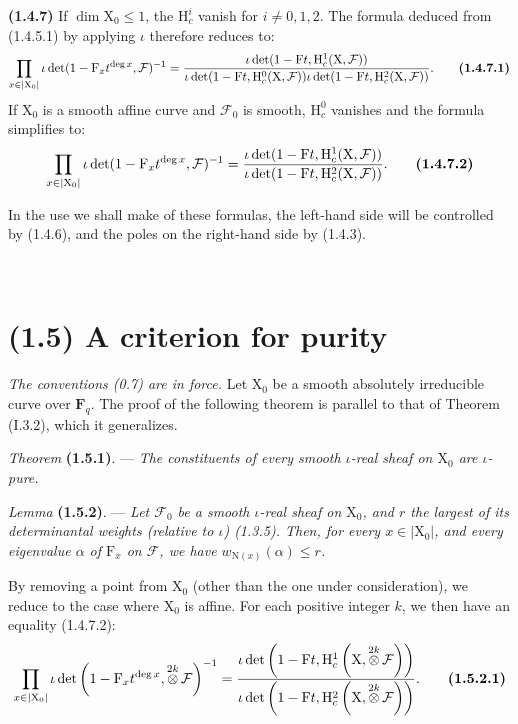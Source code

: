 \documentclass[11pt,leqno]{article}
\newcommand{\Page}[1]{\ifvmode\noindent\else\unskip\ \fi{\footnotesize\textcolor{gray}{[p.\,#1]}}\ \ignorespaces}
\begin{document}
\textbf{(1.4.7)} If \(\dim\mathrm{X}_0\le1\), the \(\mathrm{H}_c^i\) vanish for \(i\ne0,1,2\). The formula deduced from (1.4.5.1) by applying \(\iota\) therefore reduces to:
\[
\prod_{x\in|\mathrm{X}_0|}
\iota\det(1-\mathrm{F}_x t^{\deg x},\mathcal{F})^{-1}
=
\frac{\iota\det(1-\mathrm{F}t,\mathrm{H}_c^1(\mathrm{X},\mathcal{F}))}
{\iota\det(1-\mathrm{F}t,\mathrm{H}_c^0(\mathrm{X},\mathcal{F}))
 \iota\det(1-\mathrm{F}t,\mathrm{H}_c^2(\mathrm{X},\mathcal{F}))}.
\tag*{\textbf{(1.4.7.1)}}
\]
If \(\mathrm{X}_0\) is a smooth affine curve and \(\mathcal{F}_0\) is smooth, \(\mathrm{H}_c^0\) vanishes and the formula simplifies to:
\[
\prod_{x\in|\mathrm{X}_0|}
\iota\det(1-\mathrm{F}_x t^{\deg x},\mathcal{F})^{-1}
=
\frac{\iota\det(1-\mathrm{F}t,\mathrm{H}_c^1(\mathrm{X},\mathcal{F}))}
{\iota\det(1-\mathrm{F}t,\mathrm{H}_c^2(\mathrm{X},\mathcal{F}))}.
\tag*{\textbf{(1.4.7.2)}}
\]

In the use we shall make of these formulas, the left-hand side will be controlled by (1.4.6), and the poles on the right-hand side by (1.4.3).

\Page{164}
\section*{(1.5) A criterion for purity}

\textit{The conventions \textup{(0.7)} are in force.} Let \(\mathrm{X}_0\) be a smooth absolutely irreducible curve over \(\mathbf{F}_q\). The proof of the following theorem is parallel to that of Theorem (I.3.2), which it generalizes.

\textit{Theorem} \textbf{(1.5.1)}. — \textit{The constituents of every smooth \(\iota\)-real sheaf on \(\mathrm{X}_0\) are \(\iota\)-pure.}

\textit{Lemma} \textbf{(1.5.2)}. — \textit{Let \(\mathcal{F}_0\) be a smooth \(\iota\)-real sheaf on \(\mathrm{X}_0\), and \(r\) the largest of its determinantal weights (relative to \(\iota\)) \textup{(1.3.5)}. Then, for every \(x\in|\mathrm{X}_0|\), and every eigenvalue \(\alpha\) of \(\mathrm{F}_x\) on \(\mathcal{F}\), we have  \(w_{\mathrm{N}(x)}(\alpha)\le r\).}

By removing a point from \(\mathrm{X}_0\) (other than the one under consideration), we reduce to the case where \(\mathrm{X}_0\) is affine. For each positive integer \(k\), we then have an equality (1.4.7.2):
\[
\prod_{x\in|\mathrm{X}_0|}
\iota\det\left(1-\mathrm{F}_x t^{\deg x},
 \mathop{\otimes}\limits^{2k}\mathcal{F}\right)^{-1}
=
\frac{\iota\det\left(1-\mathrm{F}t,
 \mathrm{H}_c^1\left(\mathrm{X},\mathop{\otimes}\limits^{2k}\mathcal{F}\right)\right)}
{\iota\det\left(1-\mathrm{F}t,
 \mathrm{H}_c^2\left(\mathrm{X},\mathop{\otimes}\limits^{2k}\mathcal{F}\right)\right)}.
\tag*{\textbf{(1.5.2.1)}}
\]
\end{document}
